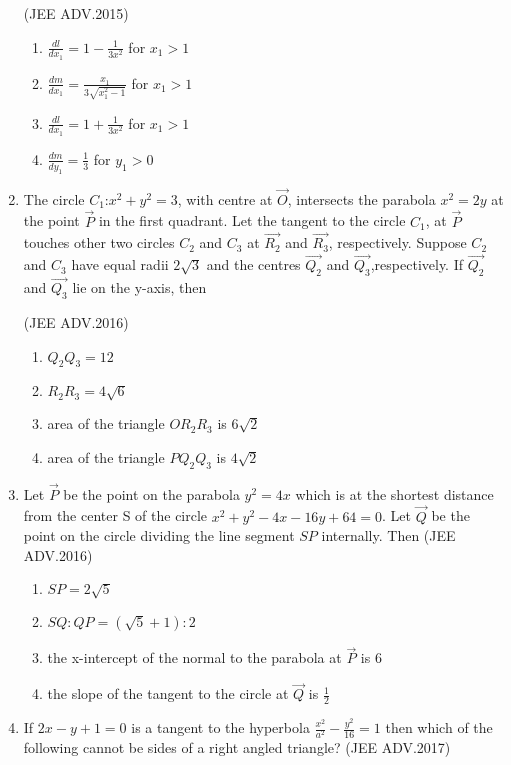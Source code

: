 \begin{enumerate}
	      \hfill(JEE ADV.2015)
	      
	       \begin{enumerate}
		      \item $\frac{dl}{dx_1}=1-\frac{1}{3x^2}$ for $x_1>1$ 
		      \item $\frac{dm}{dx_1}=\frac{x_1}{3\sqrt{x_1^2-1}}$ for $x_1>1$ 
		      \item $\frac{dl}{dx_1}=1+\frac{1}{3x^2}$ for $x_1>1$
		      \item $\frac{dm}{dy_1}=\frac{1}{3}$ for $y_1>0$ 
	       \end{enumerate}
      \item The circle $C_1$:$x^2+y^2=3$, with centre at $\vec{O}$, intersects the parabola $x^2=2y$ at the point $\vec{P}$ in the first quadrant. Let the tangent to the circle $C_1$, at $\vec{P}$ touches other two circles $C_2$ and $C_3$ at $\vec{R_2}$ and $\vec{R_3}$, respectively. Suppose $C_2$ and $C_3$ have equal radii $2\sqrt{3}$ and the centres $\vec{Q_2}$ and $\vec{Q_3}$,respectively. If $\vec{Q_2}$ and $\vec{Q_3}$ lie on the y-axis, then 

	      \hfill(JEE ADV.2016)
	      
	       \begin{enumerate}
		      \item $Q_2Q_3=12$
		      \item $R_2R_3=4\sqrt{6}$
		      \item area of the triangle $OR_2R_3$ is $6\sqrt{2}$
		      \item area of the triangle $PQ_2Q_3$ is $4\sqrt{2}$
	       \end{enumerate}
      \item Let $\vec{P}$ be the point on the parabola $y^2=4x$ which is at the shortest distance from the center S of the circle $x^2+y^2-4x-16y+64=0$. Let $\vec{Q}$ be the point on the circle
	      dividing the line segment $SP$ internally. Then 
	      \hfill(JEE ADV.2016)
	      
	       \begin{enumerate}
		      \item $SP=2\sqrt{5}$
		      \item $SQ:QP=(\sqrt{5}+1):2$
		      \item the x-intercept of the normal to the parabola at $\vec{P}$ is $6$
		      \item the slope of the tangent to the circle at $\vec{Q}$ is $\frac{1}{2}$
		      
	       \end{enumerate}
      \item If $2x-y+1=0$ is a tangent to the hyperbola $\frac{x^2}{a^2}-\frac{y^2}{16}=1$ then which of the following cannot be sides of a right angled triangle? 
	      \hfill(JEE ADV.2017)
	      

\end{enumerate}
